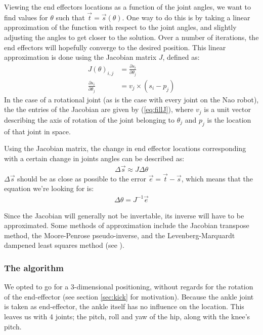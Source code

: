 \documentclass[a4paper]{article}
\begin{document}
Viewing the end effectors locations as a function of the joint angles,
we want to find values for $\theta$ such that $\vec{t} =
\vec{s}(\theta)$. One way to do this is by taking a linear
approximation of the function with respect to the joint angles, and
slightly adjusting the angles to get closer to the solution.  Over a
number of iterations, the end effectors will hopefully converge to the
desired position.  This linear approximation is done using the
Jacobian matrix $J$, defined as:
\begin{align}
  J(\theta)_{i, j} &= \frac{\partial s_i}{\partial \theta_j} \\
  \frac{\partial s_i}{\partial \theta_j} &= v_j \times (s_i - p_j)    \label{eq:fillJ}
\end{align}
In the case of a rotational joint (as is the case with every joint on
the Nao robot), the the entries of the Jacobian are given by
(\ref{eq:fillJ}), where $v_j$ is a unit vector describing the axis of
rotation of the joint belonging to $\theta_j$ and $p_j$ is the
location of that joint in space.

Using the Jacobian matrix, the change in end effector locations
corresponding with a certain change in joints angles can be described
as:
\begin{align*}
  \Delta \vec{s} \approx J \Delta \theta
\end{align*}
$\Delta \vec{s}$ should be as close as possible to the error $\vec{e}
= \vec{t} - \vec{s}$, which means that the equation
we're looking for is:
\begin{align*}
  \Delta \theta = J^{-1} \vec{e}
\end{align*}

Since the Jacobian will generally not be invertable, its inverse will
have to be approximated. Some methods of approximation include the
Jacobian transpose method, the Moore-Penrose pseudo-inverse, and the
Levenberg-Marquardt dampened least squares method (see \cite{Buss2009}).

\subsubsection{The algorithm}
We opted to go for a 3-dimensional positioning, without regards for the rotation
of the end-effector (see section \ref{sec:kick} for motivation). Because the
ankle joint is taken as end-effector, the ankle itself has no influence on the
location. This leaves us with 4 joints; the pitch, roll and yaw of the hip,
along with the knee's pitch.
\end{document}
